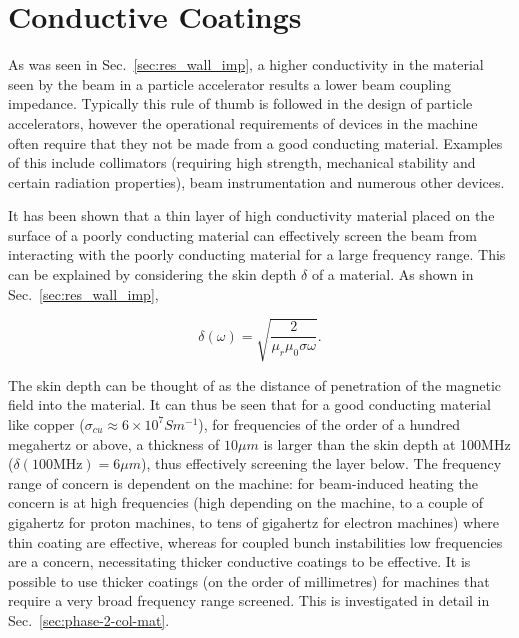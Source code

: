 \section{Conductive Coatings}
\label{sec:conductive_coatings}

As was seen in Sec.~\ref{sec:res_wall_imp}, a higher conductivity in the material seen by the beam in a particle accelerator results a lower beam coupling impedance. Typically this rule of thumb is followed in the design of particle accelerators, however the operational requirements of devices in the machine often require that they not be made from a good conducting material. Examples of this include collimators (requiring high strength, mechanical stability and certain radiation properties),  beam instrumentation and numerous other devices.

It has been shown \cite{Caspers:ThinCondLayers} that a thin layer of high conductivity material placed on the surface of a poorly conducting material can effectively screen the beam from interacting with the poorly conducting material for a large frequency range. This can be explained by considering the skin depth $\delta$ of a material. As shown in Sec.~\ref{sec:res_wall_imp}, 

\begin{equation}
\delta \left( \omega \right) = \sqrt{\frac{2}{\mu_{r}\mu_{0} \sigma \omega}}.
\end{equation}

The skin depth can be thought of as the distance of penetration of the magnetic field into the material. It can thus be seen that for a good conducting material like copper ($\sigma_{cu} \approx 6 \times 10^{7} S m^{-1}$), for frequencies of the order of a hundred megahertz or above, a thickness of $10\mu m$ is larger than the skin depth at 100MHz ($\delta \left( 100\text{MHz} \right) = 6\mu m$), thus effectively screening the layer below. The frequency range of concern is dependent on the machine: for beam-induced heating the concern is at high frequencies (high depending on the machine, to a couple of gigahertz for proton machines, to tens of gigahertz for electron machines) where thin coating are effective, whereas for coupled bunch instabilities low frequencies are a concern, necessitating thicker conductive coatings to be effective. It is possible to use thicker coatings (on the order of millimetres) for machines that require a very broad frequency range screened. This is investigated in detail in Sec.~\ref{sec:phase-2-col-mat}.

